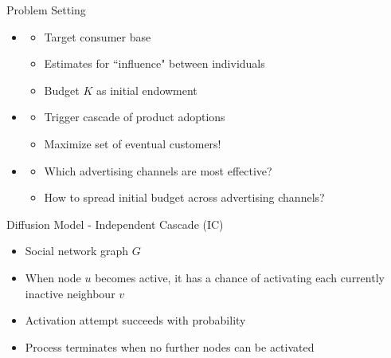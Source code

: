 \documentclass{beamer}
\begin{document}
\begin{frame}{Problem Setting}
  \begin{itemize}
    \item {\color{orange}{Given}}
    \begin{itemize}
      \item Target consumer base
      \item Estimates for ``influence" between individuals
      \item Budget $K$ as initial endowment
    \end{itemize}
    \pause
    \item {\color{orange}{Goal}}
    \begin{itemize}
      \item Trigger cascade of product adoptions
      \item Maximize set of eventual customers!
    \end{itemize}
    \pause
    \item {\color{orange}{Design Problems}}
    \begin{itemize}
      \item Which advertising channels are most effective?
      \item How to spread initial budget across advertising channels?
    \end{itemize}
  \end{itemize}
\end{frame}

\begin{frame}{Diffusion Model - Independent Cascade (IC)}
  \begin{itemize}
    \item Social network graph $G$
    \item When node $u$ becomes active, it has a {\color{red}{single}} chance of activating each currently inactive neighbour $v$
    \item Activation attempt succeeds with probability {}
    \item Process terminates when no further nodes can be activated
  \end{itemize}
\end{frame}
\end{document}
